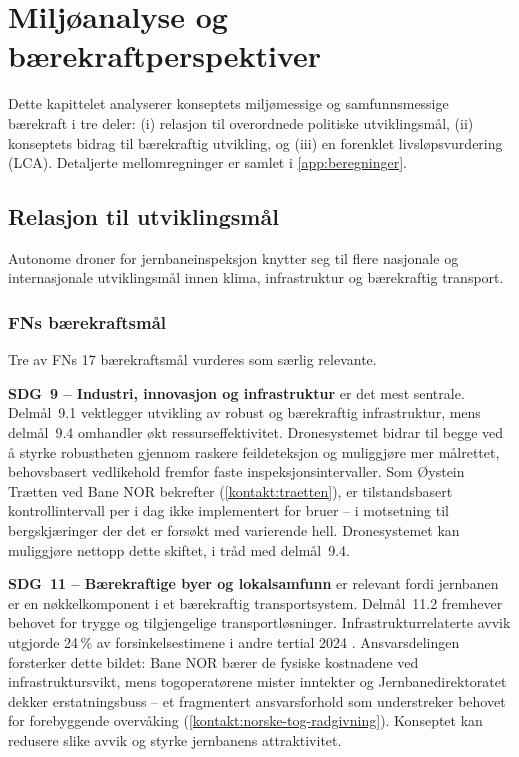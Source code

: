 \section{Miljøanalyse og bærekraftperspektiver}
\label{sec:miljoanalyse}

Dette kapittelet analyserer konseptets miljømessige og samfunnsmessige bærekraft i tre deler: (i) relasjon til overordnede politiske utviklingsmål, (ii) konseptets bidrag til bærekraftig utvikling, og (iii) en forenklet livsløpsvurdering (LCA). Detaljerte mellomregninger er samlet i \cref{app:beregninger}.

\subsection{Relasjon til utviklingsmål}

Autonome droner for jernbaneinspeksjon knytter seg til flere nasjonale og internasjonale utviklingsmål innen klima, infrastruktur og bærekraftig transport.

\subsubsection{FNs bærekraftsmål}

Tre av FNs 17 bærekraftsmål vurderes som særlig relevante.

\textbf{SDG~9 – Industri, innovasjon og infrastruktur} er det mest sentrale. Delmål~9.1 vektlegger utvikling av robust og bærekraftig infrastruktur, mens delmål~9.4 omhandler økt ressurseffektivitet. Dronesystemet bidrar til begge ved å styrke robustheten gjennom raskere feildeteksjon og muliggjøre mer målrettet, behovsbasert vedlikehold fremfor faste inspeksjonsintervaller. Som Øystein Trætten ved Bane NOR bekrefter (\cref{kontakt:traetten}), er tilstandsbasert kontrollintervall per i dag ikke implementert for bruer -- i motsetning til bergskjæringer der det er forsøkt med varierende hell. Dronesystemet kan muliggjøre nettopp dette skiftet, i tråd med delmål~9.4.

\textbf{SDG~11 – Bærekraftige byer og lokalsamfunn} er relevant fordi jernbanen er en nøkkelkomponent i et bærekraftig transportsystem. Delmål~11.2 fremhever behovet for trygge og tilgjengelige transportløsninger. Infrastrukturrelaterte avvik utgjorde 24\,\% av forsinkelsestimene i andre tertial 2024 \parencite{jernbanedirektoratet_gjennomforingsplan_2025}. Ansvarsdelingen forsterker dette bildet: Bane NOR bærer de fysiske kostnadene ved infrastruktursvikt, mens togoperatørene mister inntekter og Jernbanedirektoratet dekker erstatningsbuss -- et fragmentert ansvarsforhold som understreker behovet for forebyggende overvåking (\cref{kontakt:norske-tog-radgivning}). Konseptet kan redusere slike avvik og styrke jernbanens attraktivitet.


